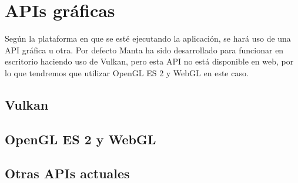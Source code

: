 \section{APIs gráficas}
\label{APIS}

Según la plataforma en que se esté ejecutando la aplicación, se hará uso de una API gráfica u otra. Por defecto Manta ha sido desarrollado para funcionar en escritorio haciendo uso de Vulkan, pero esta API no está disponible en web, por lo que tendremos que utilizar OpenGL ES 2 y WebGL en este caso.

\subsection{Vulkan}

\subsection{OpenGL ES 2 y WebGL}

\subsection{Otras APIs actuales}